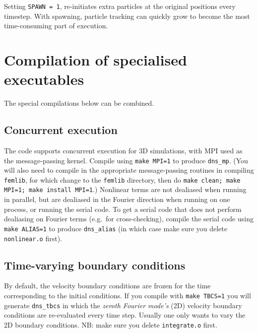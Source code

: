\documentclass[11pt,a4paper]{report}
\begin{document}
Setting \verb+SPAWN = 1+, re-initiates extra particles at the original
positions every timestep.  With spawning, particle tracking can
quickly grow to become the most time-consuming part of execution.

\chapter{Compilation of specialised executables}

The special compilations below can be combined.

\section{Concurrent execution}

The code supports concurrent execution for 3D simulations, with MPI
used as the message-passing kernel. Compile using \verb+make MPI=1+ to
produce \verb+dns_mp+. (You will also need to compile in the
appropriate message-passing routines in compiling \verb+femlib+, for
which change to the \verb+femlib+ directory, then do
\verb+make clean; make MPI=1; make install MPI=1+.)  Nonlinear terms
are not dealiased when running in parallel, but are dealiased in the
Fourier direction when running on one process, or running the serial
code. To get a serial code that does not perform dealiasing on Fourier
terms (e.g.\ for cross-checking), compile the serial code using
\verb+make ALIAS=1+ to produce \verb+dns_alias+ (in which case make
sure you delete \verb+nonlinear.o+ first).

\section{Time-varying boundary conditions}

By default, the velocity boundary conditions are frozen for the time
corresponding to the initial conditions. If you compile with
\verb+make TBCS=1+ you will generate \verb+dns_tbcs+ in which the
\emph{zeroth Fourier mode's} (2D) velocity boundary conditions are
re-evaluated every time step. Usually one only wants to vary the 2D
boundary conditions. NB: make sure you delete \verb+integrate.o+
first.

\end{document}
